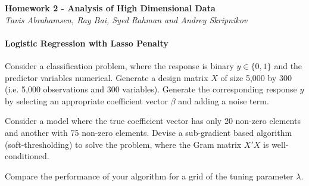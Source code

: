 \documentclass[12pt, leqno]{article}
\begin{document}
\pagestyle{fancy}

\begin{center}
{\large {\bf Homework 2 - Analysis of High Dimensional Data}} \\
{\it{Tavis Abrahamsen, Ray Bai, Syed Rahman and Andrey Skripnikov}} \\
\end{center}

\paragraph{Logistic Regression with Lasso Penalty} Consider a classification problem, where the response is
binary $y \in \{0,1\}$ and the predictor variables numerical. Generate
a design matrix $X$ of size 5,000 by 300
 (i.e. 5,000 observations and 300 variables). Generate the corresponding response $y$ by selecting an appropriate coefficient vector $\beta$ and adding a noise term.

Consider a model where the true coefficient vector has only 20 non-zero
elements and another with 75 non-zero elements. Devise a sub-gradient
based algorithm (soft-thresholding) to solve the problem, where the Gram matrix $X'X$ is well-conditioned.

Compare the performance of your algorithm for a grid of the tuning parameter $\lambda$.
\end{document}
